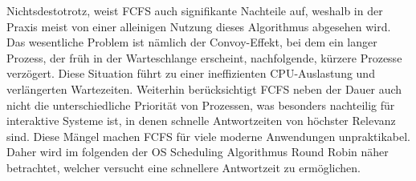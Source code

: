 Nichtsdestotrotz, weist \ac{FCFS} auch signifikante Nachteile auf, weshalb in der Praxis meist von einer alleinigen Nutzung dieses Algorithmus abgesehen wird. Das wesentliche Problem ist nämlich der Convoy-Effekt, bei dem ein langer Prozess, der früh in der Warteschlange erscheint, nachfolgende, kürzere Prozesse verzögert. Diese Situation führt zu einer ineffizienten \ac{CPU}-Auslastung und verlängerten Wartezeiten. %
Weiterhin berücksichtigt \ac{FCFS} neben der Dauer auch nicht die unterschiedliche Priorität von Prozessen, was besonders nachteilig für interaktive Systeme ist, in denen schnelle Antwortzeiten von höchster Relevanz sind. Diese Mängel machen \ac{FCFS} für viele moderne Anwendungen unpraktikabel. Daher wird im folgenden der OS Scheduling Algorithmus Round Robin näher betrachtet, welcher versucht eine schnellere Antwortzeit zu ermöglichen.

